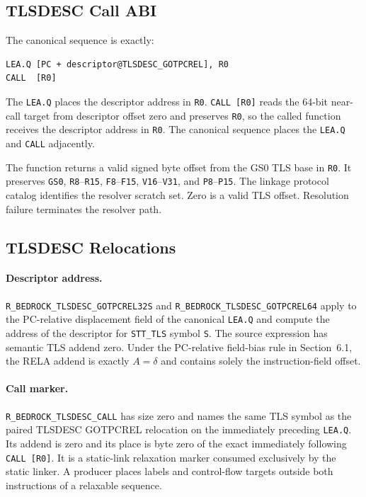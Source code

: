 \documentclass[10pt,twoside]{article}
\begin{document}
\subsection{TLSDESC Call ABI}
The canonical sequence is exactly:
\begin{verbatim}
LEA.Q [PC + descriptor@TLSDESC_GOTPCREL], R0
CALL  [R0]
\end{verbatim}
The \texttt{LEA.Q} places the descriptor address in \texttt{R0}.
\texttt{CALL [R0]} reads the 64-bit near-call target from descriptor offset
zero and preserves \texttt{R0}, so the called function receives the
descriptor address in \texttt{R0}. The canonical sequence places the
\texttt{LEA.Q} and \texttt{CALL} adjacently.

The function returns a valid signed byte offset from the GS0 TLS base in
\texttt{R0}. It preserves \texttt{GS0}, \texttt{R8}--\texttt{R15},
\texttt{F8}--\texttt{F15}, \texttt{V16}--\texttt{V31}, and
\texttt{P8}--\texttt{P15}. The linkage protocol catalog identifies the
resolver scratch set.
Zero is a valid TLS offset. Resolution failure terminates the resolver path.

\subsection{TLSDESC Relocations}
\paragraph{Descriptor address.}
\texttt{R\_BEDROCK\_TLSDESC\_GOTPCREL32S} and
\texttt{R\_BEDROCK\_TLSDESC\_GOTPCREL64} apply to the PC-relative displacement
field of the canonical \texttt{LEA.Q} and compute the address of the descriptor
for \texttt{STT\_TLS} symbol \texttt{S}. The source expression has semantic
TLS addend zero. Under the PC-relative field-bias rule in Section~6.1, the RELA
addend is exactly $A=\delta$ and contains solely the instruction-field offset.

\Needspace{1.0in}
\paragraph{Call marker.}
\texttt{R\_BEDROCK\_TLSDESC\_CALL} has size zero and names the
same TLS symbol as the paired TLSDESC GOTPCREL relocation on the immediately
preceding \texttt{LEA.Q}. Its addend is zero and its place is byte zero of the
exact immediately following \texttt{CALL [R0]}. It is a static-link relaxation
marker consumed exclusively by the static linker. A producer places labels and
control-flow targets outside both instructions of a relaxable sequence.
\end{document}
